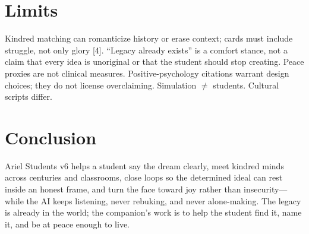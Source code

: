 \documentclass[11pt, a4paper]{article}
\begin{document}
\section{Limits}
Kindred matching can romanticize history or erase context; cards must include struggle, not only glory [4]. ``Legacy already exists'' is a comfort stance, not a claim that every idea is unoriginal or that the student should stop creating. Peace proxies are not clinical measures. Positive-psychology citations warrant design choices; they do not license overclaiming. Simulation $\neq$ students. Cultural scripts differ.

\section{Conclusion}
Ariel Students v6 helps a student say the dream clearly, meet kindred minds across centuries and classrooms, close loops so the determined ideal can rest inside an honest frame, and turn the face toward joy rather than insecurity---while the AI keeps listening, never rebuking, and never alone-making. The legacy is already in the world; the companion's work is to help the student find it, name it, and be at peace enough to live.
\end{document}
